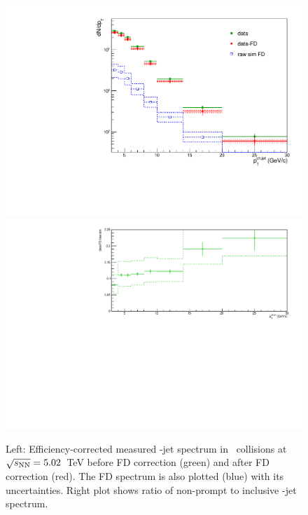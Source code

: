 \begin{figure}[bth]
\centering
\includegraphics[width=.53\textwidth]{pPbplots/jetSpectra/JetPtSpectra_FDsub}
\includegraphics[width=.45\textwidth]{pPbplots/jetSpectra/FDratio}
\caption{Left: Efficiency-corrected measured \Dstar-jet spectrum in \pPb\ collisions at $\sqrt{s_{\rm NN}}=5.02$~TeV before FD correction (green) and after FD correction (red). The FD spectrum is also plotted (blue) with its uncertainties. Right plot shows ratio of non-prompt to inclusive \Dstar-jet spectrum.}
\label{fig:pPbFD_corr}
\end{figure}


